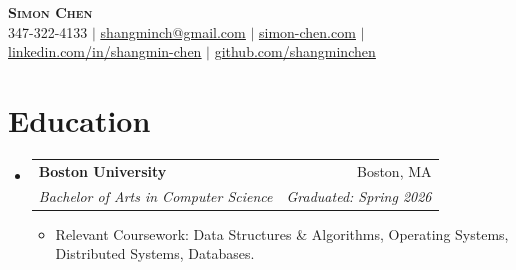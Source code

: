 \documentclass[letterpaper,11pt]{article}
\makeatletter
\newcommand{\resumeItem}[1]{
  \item\small{
    {#1 \vspace{-2pt}}
  }
}
\newcommand{\resumeSubheading}[4]{
  \vspace{-2pt}\item
    \begin{tabular*}{0.97\textwidth}[t]{l@{\extracolsep{\fill}}r}
      \textbf{#1} & #2 \\
      \textit{\small#3} & \textit{\small #4} \\
    \end{tabular*}\vspace{-7pt}
}
\newcommand{\resumeSubHeadingListStart}{\begin{itemize}[leftmargin=0.15in, label={}]}
\newcommand{\resumeSubHeadingListEnd}{\end{itemize}\vspace{-8pt}}
\newcommand{\resumeItemListStart}{\begin{itemize}}
\newcommand{\resumeItemListEnd}{\end{itemize}\vspace{-5pt}}
\makeatother
\begin{document}
\begin{center}
    \textbf{\Huge \scshape Simon Chen} \\ \vspace{1pt}
    \small 347-322-4133 $|$ \href{mailto:shangminch@gmail.com}{\underline{shangminch@gmail.com}} $|$ \href{https://simon-chen.com}{\underline{simon-chen.com}} $|$ \href{https://linkedin.com/in/shangmin-chen}{\underline{linkedin.com/in/shangmin-chen}} $|$ \href{https://github.com/shangminchen}{\underline{github.com/shangminchen}}
\end{center}

\section{Education}
  \resumeSubHeadingListStart
    \resumeSubheading
      {Boston University}{Boston, MA}
      {Bachelor of Arts in Computer Science}{Graduated: Spring 2026}
      \resumeItemListStart
        \resumeItem{Relevant Coursework: Data Structures \& Algorithms, Operating Systems, Distributed Systems, Databases.}
      \resumeItemListEnd
  \resumeSubHeadingListEnd

\end{document}
